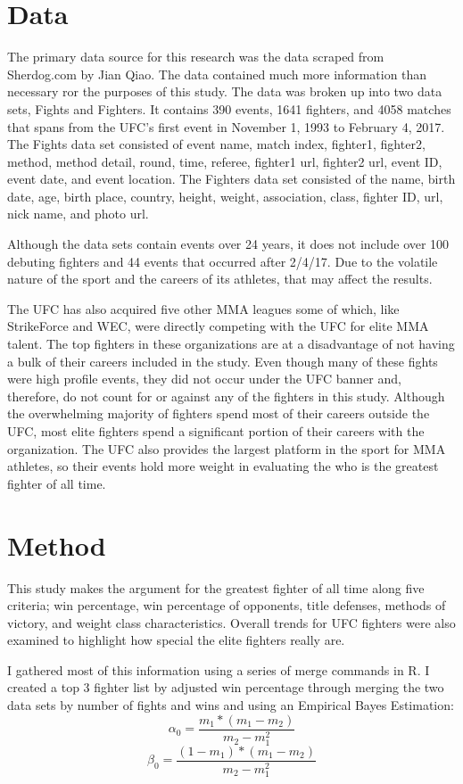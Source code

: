 \documentclass[12pt,english]{report}
\begin{document}
\section{Data}
\par The primary data source for this research was the data scraped from Sherdog.com by Jian Qiao. The data contained much more information than necessary ror the purposes of this study. The data was broken up into two data sets, Fights and Fighters. It contains 390 events, 1641 fighters, and 4058 matches that spans from the UFC's first event in November 1, 1993 to February 4, 2017. The Fights data set consisted of event name, match index, fighter1, fighter2, method, method detail, round, time, referee, fighter1 url, fighter2 url, event ID, event date, and event location. The Fighters data set consisted of the name, birth date, age, birth place, country, height, weight, association, class, fighter ID, url, nick name, and photo url. \par Although the data sets contain events over 24 years, it does not include over 100 debuting fighters and 44 events that occurred after 2/4/17. Due to the volatile nature of the sport and the careers of its athletes, that may affect the results. \par The UFC has also acquired five other MMA leagues some of which, like StrikeForce and WEC, were directly competing with the UFC for elite MMA talent.\cite{harty_2014} The top fighters in these organizations are at a disadvantage of not having a bulk of their careers included in the study. Even though many of these fights were high profile events, they did not occur under the UFC banner and, therefore, do not count for or against any of the fighters in this study. Although the overwhelming majority of fighters spend most of their careers outside the UFC, most elite fighters spend a significant portion of their careers with the organization. The UFC also provides the largest platform in the sport for MMA athletes, so their events hold more weight in evaluating the who is the greatest fighter of all time. 
\section{Method}
\par This study makes the argument for the greatest fighter of all time along five criteria; win percentage, win percentage of opponents, title defenses, methods of victory, and weight class characteristics. Overall trends for UFC fighters were also examined to highlight how special the elite fighters really are. \par I gathered most of this information using a series of merge commands in R. I created a top 3 fighter list by adjusted win percentage through merging the two data sets by number of fights and wins and using an Empirical Bayes Estimation:
\begin{equation}
\alpha_{0} = \frac{m_{1}*(m_{1}-m_{2})}{m_{2} - m_{1}^2}
\end{equation}
\begin{equation}
\beta_{0} = \frac{(1 - m_{1})*(m_{1}-m_{2})}{m_{2} - m_{1}^2}
\end{equation}
\end{document}
